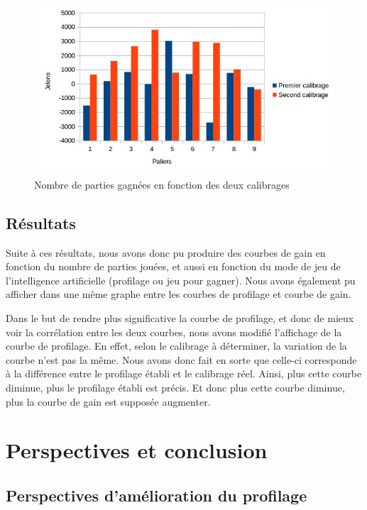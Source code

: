 \documentclass{report}
\begin{document}
\begin{figure}[H]
	\begin{center}
		\includegraphics[scale=0.5]{./imagesRapport/JetonsGagnesEnFonctionCalibrage.jpg}
	\end{center}
	\caption{Nombre de parties gagnées en fonction des deux calibrages}
\end{figure}


\section{Résultats}
\hspace{0.5cm}Suite à ces résultats, nous avons donc pu produire des courbes de gain en fonction du nombre de parties jouées, et aussi en fonction du mode de jeu de l'intelligence artificielle (profilage ou jeu pour gagner). Nous avons également pu afficher dans une même graphe entre les courbes de profilage et courbe de gain.\par
Dans le but de rendre plus significative la courbe de profilage, et donc de mieux voir la corrélation entre les deux courbes, nous avons modifié l'affichage de la courbe de profilage. En effet, selon le calibrage à déterminer, la variation de la courbe n'est pas la même. Nous avons donc fait en sorte que celle-ci corresponde à la différence entre le profilage établi et le calibrage réel. Ainsi, plus cette courbe diminue, plus le profilage établi est précis. Et donc plus cette courbe diminue, plus la courbe de gain est supposée augmenter.\\
 

\chapter{Perspectives et conclusion}
\section{Perspectives d'amélioration du profilage}
\end{document}

